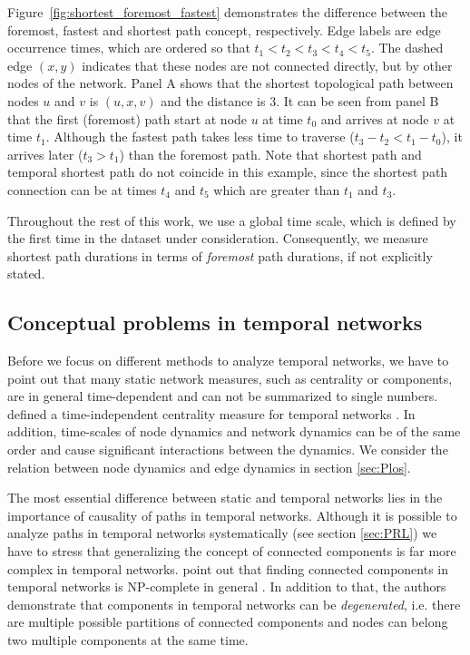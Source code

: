 Figure~\ref{fig:shortest_foremost_fastest} demonstrates the difference between the foremost, fastest and shortest path concept, respectively.
Edge labels are edge occurrence times, which are ordered so that $t_1<t_2<t_3<t_4<t_5$.
The dashed edge $(x,y)$ indicates that these nodes are not connected directly, but by other nodes of the network.
Panel A shows that the shortest topological path between nodes $u$ and $v$ is $(u,x,v)$ and the distance is $3$.
It can be seen from panel B that the first (foremost) path start at node $u$ at time $t_0$ and arrives at node $v$ at time $t_1$.
Although the fastest path takes less time to traverse ($t_3-t_2<t_1-t_0$), it arrives later ($t_3>t_1$) than the foremost path.
Note that shortest path and temporal shortest path do not coincide in this example, since the shortest path connection can be at times $t_4$ and $t_5$ which are greater than $t_1$ and $t_3$.

Throughout the rest of this work, we use a global time scale, which is defined by the first time in the dataset under consideration.
Consequently, we measure shortest path durations in terms of \emph{foremost} path durations, if not explicitly stated.

\subsection{Conceptual problems in temporal networks}\label{sec:conceptual_problems}
Before we focus on different methods to analyze temporal networks, we have to point out that many static network measures, such as centrality or components, are in general time-dependent and can not be summarized to single numbers.
\citeauthor{Grindrod:2011fg} defined a time-independent centrality measure for temporal networks \citep{Grindrod:2011fg}. 
In addition, time-scales of node dynamics and network dynamics can be of the same order and cause significant interactions between the dynamics.
We consider the relation between node dynamics and edge dynamics in section \ref{sec:Plos}.

The most essential difference between static and temporal networks lies in the importance of causality of paths in temporal networks.
Although it is possible to analyze paths in temporal networks systematically (see section \ref{sec:PRL}) we have to stress that generalizing the concept of connected components is far more complex in temporal networks.
\citeauthor{Nicosia:2012hz} point out that finding connected components in temporal networks is NP-complete in general \citep{Nicosia:2012hz}.
In addition to that, the authors demonstrate that components in temporal networks can be \emph{degenerated}, i.e. there are multiple possible partitions of connected components and nodes can belong two multiple components at the same time.

